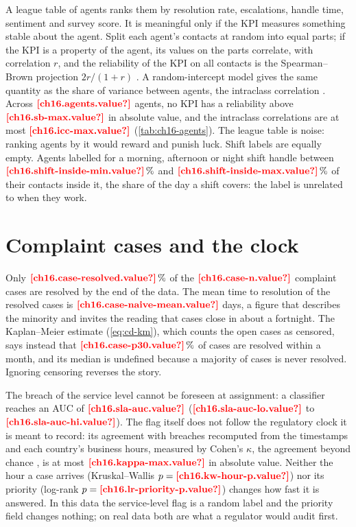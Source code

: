 A league table of agents ranks them by resolution rate, escalations, handle time, sentiment and survey score. It is meaningful
only if the KPI measures something stable about the agent. Split each agent's contacts at random into equal parts; if the KPI is a property of the agent, its values on the parts correlate, with correlation $r$, and the reliability of the KPI on all contacts
is the Spearman--Brown projection $2r / (1 + r)$ \autocite{spearman1910,brown1910}. A random-intercept model gives the same
quantity as the share of variance between agents, the intraclass correlation \autocite{shrout1979}. Across
$\est{ch16.agents}{value}$ agents, no KPI has a reliability above $\est{ch16.sb-max}{value}$ in absolute value, and the intraclass
correlations are at most $\est{ch16.icc-max}{value}$ (\cref{tab:ch16-agents}). The league table is noise: ranking agents by it
would reward and punish luck. Shift labels are equally empty. Agents labelled for a morning, afternoon or night shift handle
between $\est{ch16.shift-inside-min}{value}\,\%$ and $\est{ch16.shift-inside-max}{value}\,\%$ of their contacts inside it, the
share of the day a shift covers: the label is unrelated to when they work.



\section{Complaint cases and the clock}\label{sec:op-cases}

Only $\est{ch16.case-resolved}{value}\,\%$ of the $\est{ch16.case-n}{value}$ complaint cases are resolved by the end of the data.
The mean time to resolution of the resolved cases is $\est{ch16.case-naive-mean}{value}$ days, a figure that describes the
minority and invites the reading that cases close in about a fortnight. The Kaplan--Meier estimate (\cref{eq:cd-km}), which
counts the open cases as censored, says instead that $\est{ch16.case-p30}{value}\,\%$ of cases are resolved within a month, and its median is undefined because a majority of cases is never resolved. Ignoring censoring reverses the story.

The breach of the service level cannot be foreseen at assignment: a classifier reaches an AUC of $\est{ch16.sla-auc}{value}$
($\est{ch16.sla-auc-lo}{value}$ to $\est{ch16.sla-auc-hi}{value}$). The flag itself does not follow the regulatory clock it is
meant to record: its agreement with breaches recomputed from the timestamps and each country's business hours, measured by
Cohen's $\kappa$, the agreement beyond chance \autocite{cohen1960}, is at most $\est{ch16.kappa-max}{value}$ in absolute value.
Neither the hour a case arrives (Kruskal--Wallis $p = \est{ch16.kw-hour-p}{value}$) nor its priority (log-rank
$p = \est{ch16.lr-priority-p}{value}$) changes how fast it is answered. In this data the service-level flag is a random label and
the priority field changes nothing; on real data both are what a regulator would audit first.

